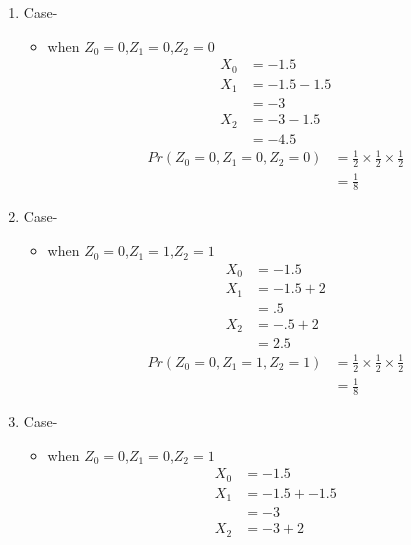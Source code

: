 \documentclass[11pt,a4paper,twocolumn]{article}
\begin{document}
\begin{enumerate}
    \item Case-
    \begin{itemize}
        \item when $Z_{0}=0$,$Z_{1}=0$,$Z_{2}=0$\\
        \begin{align*}
            X_{0}&=-1.5\\
            X_{1}&=-1.5-1.5\\
            &=-3\\
            X_{2}&=-3-1.5\\
            &=-4.5
        \end{align*}
        \begin{align*}
            Pr(Z_{0}=0,Z_{1}=0,Z_{2}=0)&=\frac{1}{2}\times\frac{1}{2}\times\frac{1}{2}\\
            &=\frac{1}{8}
        \end{align*}
    \end{itemize}
    \item Case-
    \begin{itemize}
        \item when $Z_{0}=0$,$Z_{1}=1$,$Z_{2}=1$\\
        \begin{align*}
            X_{0}&=-1.5\\
            X_{1}&=-1.5+2\\
            &=.5\\
            X_{2}&=-.5+2\\
            &=2.5
        \end{align*}
        \begin{align*}
            Pr(Z_{0}=0,Z_{1}=1,Z_{2}=1)&=\frac{1}{2}\times\frac{1}{2}\times\frac{1}{2}\\
            &=\frac{1}{8}
        \end{align*}
    \end{itemize}
\newpage
     \item Case-
    \begin{itemize}
        \item when $Z_{0}=0$,$Z_{1}=0$,$Z_{2}=1$\\
        \begin{align*}
            X_{0}&=-1.5\\
            X_{1}&=-1.5+-1.5\\
            &=-3\\
            X_{2}&=-3+2\\

\end{align*}
\end{itemize}
\end{enumerate}
\end{document}
